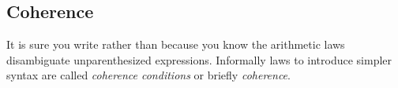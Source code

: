 \subsection{Coherence}

It is sure you write
rather than
because you know the arithmetic laws
disambiguate unparenthesized expressions.
Informally laws to introduce simpler syntax are called \emph{coherence conditions} or briefly \emph{coherence}.

